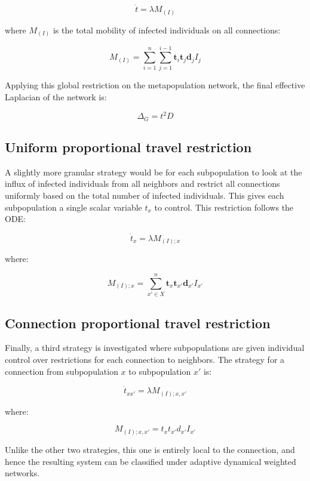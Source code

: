 \[
\dot{t} = \lambda M_{(I)}
\]

where $M_{(I)}$ is the total mobility of infected individuals on all connections:

\[
M_{(I)} = \sum_{i=1}^{n} \sum_{j=1}^{i-1} \mathbf{t}_{i} \mathbf{t}_{j} \mathbf{d}_{j} I_{j}
\]

Applying this global restriction on the metapopulation network, the final effective Laplacian of the network is:

\[
\Delta_G = t^2 D
\]

\subsection{Uniform proportional travel restriction}

A slightly more granular strategy would be for each subpopulation to look at the influx of infected individuals from all neighbors and restrict all connections uniformly based on the total number of infected individuals. This gives each subpopulation a single scalar variable $t_x$ to control. This restriction follows the ODE:

\[
\dot{t}_x = \lambda M_{(I);x}
\]

where:

\[
M_{(I);x} = \sum_{x' \in X}^{n} \mathbf{t}_x \mathbf{t}_{x'} \mathbf{d}_{x'} I_{x'}
\]

\subsection{Connection proportional travel restriction}

Finally, a third strategy is investigated where subpopulations are given individual control over restrictions for each connection to neighbors. The strategy for a connection from subpopulation $x$ to subpopulation $x'$ is:

\[
\dot{t}_{xx'} = \lambda M_{(I);x,x'}
\]

where:

\[
M_{(I);x,x'} = t_x t_{x'} d_{x'} I_{x'}
\]

Unlike the other two strategies, this one is entirely local to the connection, and hence the resulting system can be classified under adaptive dynamical weighted networks\cite{berner2023adaptive}.
